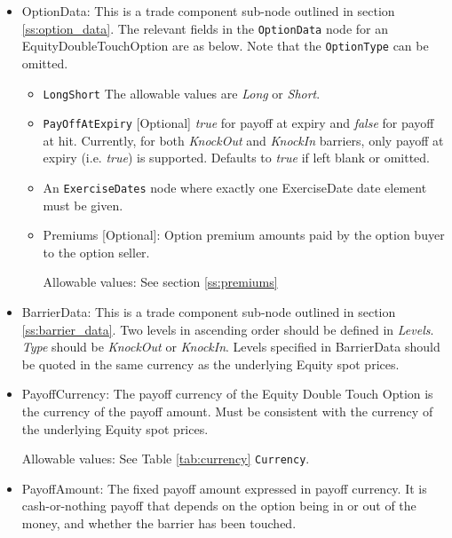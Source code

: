 \begin{itemize}

\item OptionData: This is a trade component sub-node outlined in section \ref{ss:option_data}. 
The relevant fields in the \lstinline!OptionData! node for an EquityDoubleTouchOption are as below. Note that the \lstinline!OptionType! can be omitted.

\begin{itemize}
\item \lstinline!LongShort! The allowable values are \emph{Long} or \emph{Short}.


\item  \lstinline!PayOffAtExpiry! [Optional] \emph{true} for payoff at expiry and \emph{false} for payoff at hit.
Currently, for both \emph{KnockOut} and \emph{KnockIn} barriers, only payoff at expiry (i.e. \emph{true}) is supported. Defaults to  \emph{true} if left blank or omitted.


\item An \lstinline!ExerciseDates! node where exactly one ExerciseDate date element must be given.

\item Premiums [Optional]: Option premium amounts paid by the option buyer to the option seller.

Allowable values:  See section \ref{ss:premiums}

\end{itemize}


\item BarrierData: This is a trade component sub-node outlined in section \ref{ss:barrier_data}.
Two levels in ascending order should be defined in \emph{Levels}. \emph{Type} should be \emph{KnockOut} or \emph{KnockIn}. Levels specified in BarrierData should be quoted  in the same currency as the underlying Equity spot prices. 

\item PayoffCurrency: The payoff currency of the Equity Double Touch Option is the currency of the payoff amount. Must be consistent with the currency of the underlying Equity spot prices.   

Allowable values:  See Table \ref{tab:currency} \lstinline!Currency!.

\item PayoffAmount: The fixed payoff amount expressed in payoff currency. It is cash-or-nothing payoff that depends on the option being in or out of the money, and whether the barrier has been touched.


\end{itemize}
